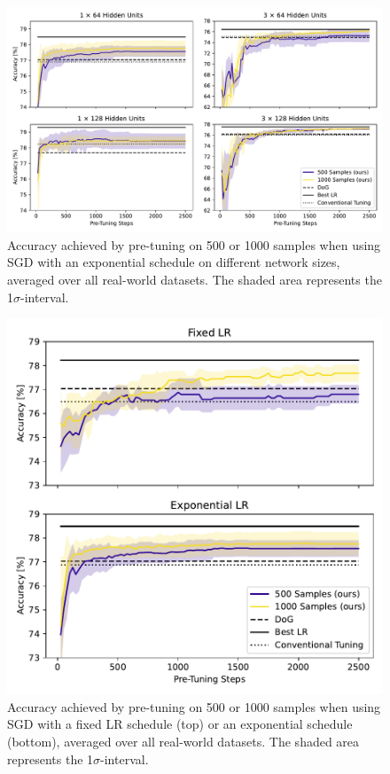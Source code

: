 \documentclass[letterpaper]{article} %
\begin{document}
\begin{figure}[h]
	\centering
	\includegraphics[width=.47\textwidth]{figures/pretune_architectures_exp_schedule.pdf}
	\caption{Accuracy achieved by pre-tuning on 500 or 1000 samples when using SGD with an exponential schedule on different network sizes, averaged over all real-world datasets. The shaded area represents the 1$\sigma$-interval.}
\end{figure}

\begin{figure}[h]
	\centering
	\includegraphics[width=.47\textwidth]{figures/pretune_1x64_fixed_vs_exp_schedule.pdf}
	\caption{Accuracy achieved by pre-tuning on 500 or 1000 samples when using SGD with a fixed LR schedule (top) or an exponential schedule (bottom), averaged over all real-world datasets. The shaded area represents the 1$\sigma$-interval.}\label{fig:pretune_fixed_vs_exp_lr}
\end{figure}
\end{document}
